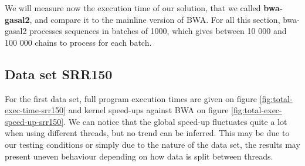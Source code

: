We will measure now the execution time of our solution, that we called \textbf{bwa-gasal2}, and compare it to the mainline version of BWA. For all this section, bwa-gasal2 processes sequences in batches of 1000, which gives between 10 000 and 100 000 chains to process for each batch.

\subsection{Data set SRR150}

For the first data set, full program execution times are given on figure \ref{fig:total-exec-time-srr150} and kernel speed-ups against BWA on figure \ref{fig:total-exec-speed-up-srr150}. We can notice that the global speed-up fluctuates quite a lot when using different threads, but no trend can be inferred. This may be due to our testing conditions or simply due to the nature of the data set, the results may present uneven behaviour depending on how data is split between threads.

